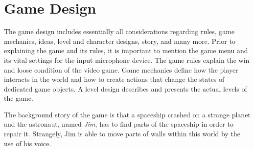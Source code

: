 
\section{Game Design}\label{sec:game_design}
The game design includes essentially all considerations regarding rules, game mechanics, ideas, level and character designs, story, and many more. 
Prior to explaining the game and its rules, it is important to mention the game menu and its vital settings for the input microphone device.
The game rules explain the win and loose condition of the video game.
Game mechanics define how the player interacts in the world and how to create actions that change the states of dedicated game objects.
A level design describes and presents the actual levels of the game.

The background story of the game is that a spaceship crashed on a strange planet and the astronaut, named \emph{Jim}, has to find parts of the spaceship in order to repair it.
Strangely, Jim is able to move parts of walls within this world by the use of his voice.



